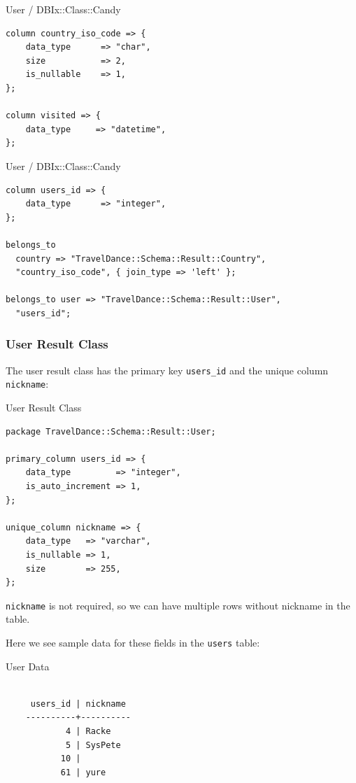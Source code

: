 \begin{frame}[fragile]{User / DBIx::Class::Candy}
\begin{lstlisting}
column country_iso_code => {
    data_type      => "char",
    size           => 2,
    is_nullable    => 1,
};

column visited => {
    data_type     => "datetime",
};
\end{lstlisting}
\end{frame}

\begin{frame}[fragile]{User / DBIx::Class::Candy}
\begin{lstlisting}
column users_id => {
    data_type      => "integer",
};

belongs_to
  country => "TravelDance::Schema::Result::Country",
  "country_iso_code", { join_type => 'left' };

belongs_to user => "TravelDance::Schema::Result::User",
  "users_id";
\end{lstlisting}
\end{frame}

\subsubsection{User Result Class}

The user result class has the primary key \verb|users_id| and the
unique column \verb|nickname|:

\begin{frame}[fragile]{User Result Class}
\begin{lstlisting}
package TravelDance::Schema::Result::User;

primary_column users_id => {
    data_type         => "integer",
    is_auto_increment => 1,
};

unique_column nickname => {
    data_type   => "varchar",
    is_nullable => 1,
    size        => 255,
};
\end{lstlisting}
\end{frame}

\verb|nickname| is not required, so we can have multiple
rows without nickname in the table.

Here we see sample data for these fields in the
\verb|users| table:

\begin{frame}[fragile]{User Data}
\begin{lstlisting}

     users_id | nickname
    ----------+----------
            4 | Racke
            5 | SysPete
           10 |
           61 | yure

\end{lstlisting}
\end{frame}


